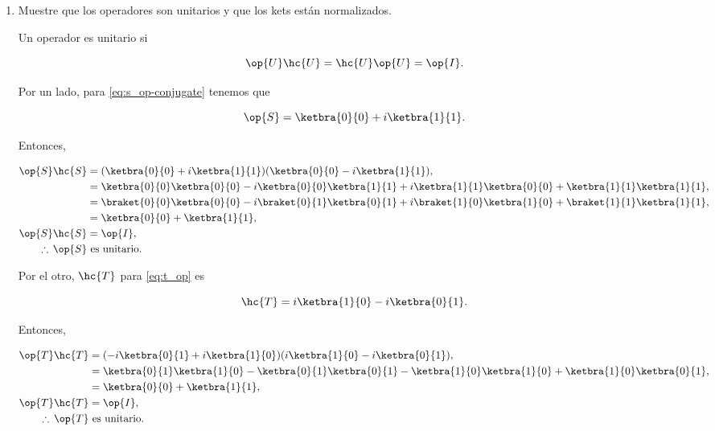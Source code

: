 \documentclass[./../main.tex]{subfiles}
\begin{document}
    \begin{enumerate}
        \item Muestre que los operadores son unitarios y que los kets están normalizados.
        
        \startsolution

        Un operador es unitario si

        \begin{equation*}
            \op{U}\hc{U} = \hc{U}\op{U} = \op{I}.
        \end{equation*}

        Por un lado, para \cref{eq:s_op-conjugate} tenemos que

        \begin{equation*}
            \op{S} = \ketbra{0}{0} + i\ketbra{1}{1}.
        \end{equation*}

        Entonces,

        \begin{align*}
            \op{S}\hc{S} &= (\ketbra{0}{0} + i\ketbra{1}{1})(\ketbra{0}{0} - i\ketbra{1}{1}),\\
            &= \ketbra{0}{0}\ketbra{0}{0} - i\ketbra{0}{0}\ketbra{1}{1} + i\ketbra{1}{1}\ketbra{0}{0} + \ketbra{1}{1}\ketbra{1}{1},\\
            &= \braket{0}{0}\ketbra{0}{0} - i\braket{0}{1}\ketbra{0}{1} + i\braket{1}{0}\ketbra{1}{0} + \braket{1}{1}\ketbra{1}{1},\\
            &= \ketbra{0}{0} + \ketbra{1}{1},\\
            \op{S}\hc{S} &= \op{I},\\
            \therefore\, \op{S} &\text{ es unitario}.
        \end{align*}

        Por el otro, \(\hc{T}\) para \cref{eq:t_op} es

        \begin{equation*}
            \hc{T} = i\ketbra{1}{0} - i\ketbra{0}{1}.
        \end{equation*}

        Entonces,

        \begin{align*}
            \op{T}\hc{T} &= (-i\ketbra{0}{1} + i\ketbra{1}{0})(i\ketbra{1}{0} - i\ketbra{0}{1}),\\
            &= \ketbra{0}{1}\ketbra{1}{0} - \ketbra{0}{1}\ketbra{0}{1} - \ketbra{1}{0}\ketbra{1}{0} + \ketbra{1}{0}\ketbra{0}{1},\\
            &= \ketbra{0}{0} + \ketbra{1}{1},\\
            \op{T}\hc{T} &= \op{I},\\
            \therefore\, \op{T} &\text{ es unitario}.
        \end{align*}


\end{enumerate}
\end{document}

